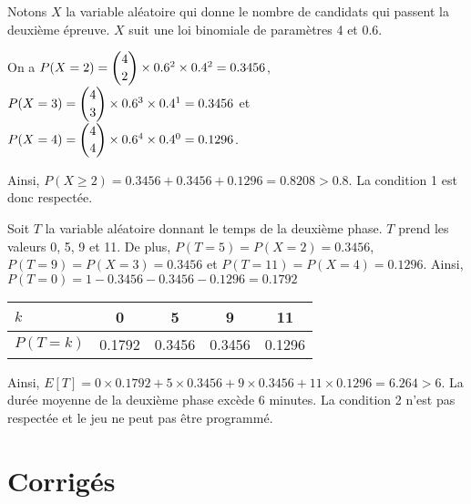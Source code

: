\documentclass[11pt,fleqn, openany]{book} %
\begin{document}
\begin{solution}
Notons $X$ la variable aléatoire qui donne le nombre de candidats qui passent la deuxième épreuve. $X$ suit une loi binomiale de paramètres 4 et 0.6.

On a $P(X=2)=\dbinom{4}{2} \times 0.6^2 \times 0.4^2 = 0.3456$, $P(X=3)=\dbinom{4}{3} \times 0.6^3 \times 0.4^1 = 0.3456$ et \\$P(X=4)=\dbinom{4}{4} \times 0.6^4 \times 0.4^0 = 0.1296$.

Ainsi, $P(X\geqslant 2)=0.3456+0.3456+0.1296 =0.8208 > 0.8$. La condition 1 est donc respectée. 

Soit $T$ la variable aléatoire donnant le temps de la deuxième phase. $T$ prend les valeurs 0, 5, 9 et 11. De plus, $P(T=5)=P(X=2)=0.3456$, $P(T=9)=P(X=3)=0.3456$ et $P(T=11)=P(X=4)=0.1296$. Ainsi, $P(T=0)=1-0.3456-0.3456-0.1296 = 0.1792$

\begin{center}
\begin{tabular}{|l|c|c|c|c|}
\hline
$k$ & 0& 5& 9& 11\\
\hline 
$P(T=k)$ & 0.1792 & 0.3456 & 0.3456 & 0.1296 \\
\hline
\end{tabular}
\end{center}
Ainsi, $E[T]=0 \times 0.1792 + 5 \times 0.3456 + 9 \times 0.3456 + 11 \times 0.1296 = 6.264 >6$. La durée moyenne de la deuxième phase excède 6 minutes. La condition 2 n'est pas respectée et le jeu ne peut pas être programmé. \end{solution}



\chapter{Corrigés}



\printsolutions[headings={false} ]
\end{document}
